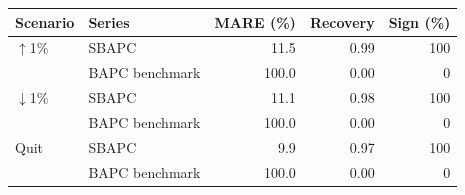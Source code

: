 \begingroup
\renewcommand{\arraystretch}{1.08}
\setlength{\tabcolsep}{4pt}
\begin{tabular}{llrrr}
\toprule
Scenario & Series & MARE (\%) & Recovery & Sign (\%) \\
\midrule
$\uparrow$1\% & SBAPC & 11.5 & 0.99 & 100 \\
 & BAPC benchmark & 100.0 & 0.00 & 0 \\
\midrule
$\downarrow$1\% & SBAPC & 11.1 & 0.98 & 100 \\
 & BAPC benchmark & 100.0 & 0.00 & 0 \\
\midrule
Quit & SBAPC & 9.9 & 0.97 & 100 \\
 & BAPC benchmark & 100.0 & 0.00 & 0 \\
\bottomrule
\end{tabular}
\endgroup
